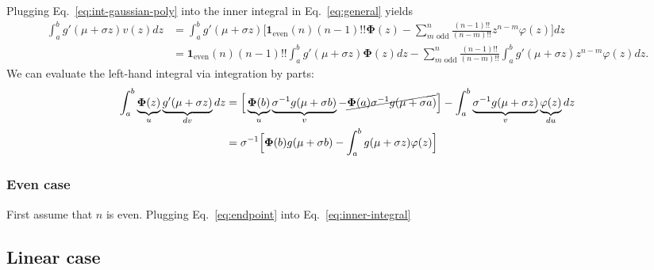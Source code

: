 \documentclass{article}
\theoremstyle{plain}
\theoremstyle{definition}
\theoremstyle{remark}
\newcommand{\Pphi}{\boldsymbol{\Phi}}
\begin{document}
Plugging Eq.~\ref{eq:int-gaussian-poly} into the inner integral in Eq.~\ref{eq:general} yields
\begin{align}
    \int_{a}^{b} g'(\mu + \sigma z) v(z) dz &= \int_{a}^{b} g'(\mu + \sigma z) \Big [ \mathbf{1}_{\text{even}}(n) (n - 1)!! \Pphi(z) - \sum_{m\text{ odd}}^n \frac{(n - 1)!!}{(n - m)!!} z^{n - m} \varphi(z) \Big ] dz \\
    &= \mathbf{1}_{\text{even}}(n) (n - 1)!! \int_{a}^{b} g'(\mu + \sigma z) \Pphi(z) dz - \sum_{m\text{ odd}}^n \frac{(n - 1)!!}{(n - m)!!} \int_{a}^{b} g'(\mu + \sigma z) z^{n - m} \varphi(z) dz.\label{eq:inner-integral}
\end{align}
We can evaluate the left-hand integral via integration by parts: 
\begin{align}\label{eq:endpoint}
    \int_{a}^{b} \underbrace{\Pphi(z)}_{u} \underbrace{g'(\mu + \sigma z)}_{dv} dz &= \Big [ \underbrace{\Pphi(b)}_{u} \underbrace{\sigma^{-1} g(\mu + \sigma b)}_{v} - \cancel{\Pphi(a) \sigma^{-1} g(\mu + \sigma a)} \Big ] - \int_{a}^{b} \underbrace{\sigma^{-1} g(\mu + \sigma z)}_{v} \underbrace{\varphi(z)}_{du} dz \\
    &= \sigma^{-1} \Big [ \Pphi(b) g(\mu + \sigma b) - \int_{a}^{b} g(\mu + \sigma z) \varphi(z) \Big ]
\end{align}
\subsubsection{Even case}
First assume that $n$ is even. Plugging Eq.~\ref{eq:endpoint} into Eq.~\ref{eq:inner-integral} 

\subsection{Linear case}
\end{document}
